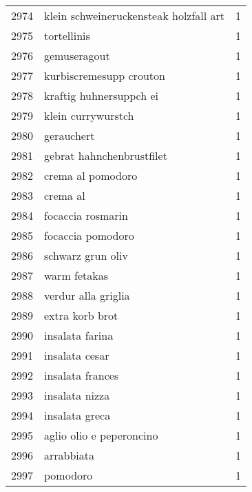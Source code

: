 \begin{tabular}{llr}
2974 &             klein schweineruckensteak holzfall art &      1 \\
2975 &                                        tortellinis &      1 \\
2976 &                                       gemuseragout &      1 \\
2977 &                            kurbiscremesupp crouton &      1 \\
2978 &                            kraftig huhnersuppch ei &      1 \\
2979 &                                 klein currywurstch &      1 \\
2980 &                                         gerauchert &      1 \\
2981 &                          gebrat hahnchenbrustfilet &      1 \\
2982 &                                  crema al pomodoro &      1 \\
2983 &                                           crema al &      1 \\
2984 &                                  focaccia rosmarin &      1 \\
2985 &                                  focaccia pomodoro &      1 \\
2986 &                                  schwarz grun oliv &      1 \\
2987 &                                       warm fetakas &      1 \\
2988 &                                verdur alla griglia &      1 \\
2989 &                                    extra korb brot &      1 \\
2990 &                                    insalata farina &      1 \\
2991 &                                     insalata cesar &      1 \\
2992 &                                   insalata frances &      1 \\
2993 &                                     insalata nizza &      1 \\
2994 &                                     insalata greca &      1 \\
2995 &                           aglio olio e peperoncino &      1 \\
2996 &                                         arrabbiata &      1 \\
2997 &                                           pomodoro &      1 \\

\end{tabular}
